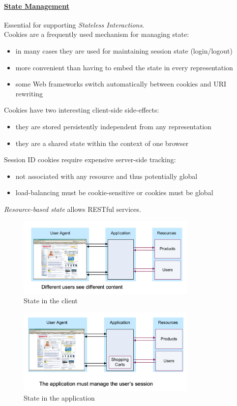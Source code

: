 \documentclass[10pt,a4paper]{article}
\begin{document}
\paragraph{\uline{State Management}} 
Essential for supporting \textit{Stateless Interactions}.\\ Cookies are a frequently used mechanism for managing state:
\begin{itemize}
	\item in many cases they are used for maintaining session state (login/logout)
	\item more convenient than having to embed the state in every representation
	\item some Web frameworks switch automatically between cookies and URI rewriting
\end{itemize}
Cookies have two interesting client-side side-effects:
\begin{itemize}
	\item they are stored persistently independent from any representation
	\item they are a shared state within the context of one browser
\end{itemize}
Session ID cookies require expensive server-side tracking:
\begin{itemize}
	\item not associated with any resource and thus potentially global
	\item load-balancing must be cookie-sensitive or cookies must be global
\end{itemize}
\textit{Resource-based state} allows RESTful services.
  \begin{figure}[ht!]
 \hfill \includegraphics[width=250pt]{images/state-client}
 \hspace*{\fill}
 \caption{State in the client}
 \end{figure}
   \begin{figure}[ht!]
 \hfill \includegraphics[width=250pt]{images/state-application}
 \hspace*{\fill}
 \caption{State in the application}
 \end{figure}
\end{document}
